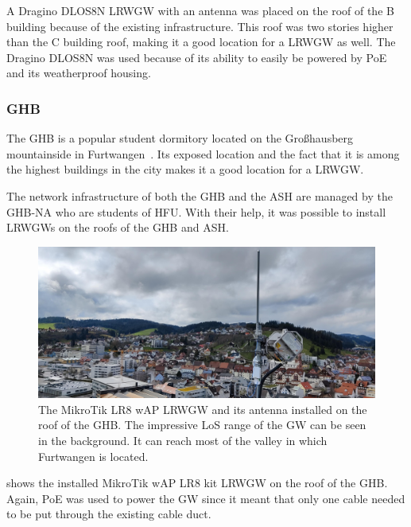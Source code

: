 A Dragino DLOS8N \acl{LRWGW} with an antenna was placed on the roof of the B building because of the existing infrastructure.
This roof was two stories higher than the C building roof, making it a good location for a \acl{LRWGW} as well.
The Dragino DLOS8N was used because of its ability to easily be powered by \ac{PoE} and its weatherproof housing.

\subsubsection{\acl{GHB}}

The \ac{GHB} is a popular student dormitory located on the Großhausberg mountainside in Furtwangen~\cite{ghb_netadmins_student_2023}.
Its exposed location and the fact that it is among the highest buildings in the city makes it a good location for a \acl{LRWGW}.

The network infrastructure of both the \ac{GHB} and the \ac{ASH} are managed by the \acl{GHB-NA} who are students of \ac{HFU}.
With their help, it was possible to install \aclp{LRWGW} on the roofs of the \ac{GHB} and \ac{ASH}.

\begin{figure}[htbp]
    \centering
    \includegraphics[width=1\textwidth]{pictures/hardware/gateway-deployment/lr8_ghb_installation.jpg}
    \caption[MikroTik LR8 wAP \acl{LRWGW} and its antenna installed on the roof of the \acl{GHB}]{
        The MikroTik LR8 wAP \acl{LRWGW} and its antenna installed on the roof of the \ac{GHB}.
        The impressive \ac{LoS} range of the \acl{GW} can be seen in the background.
        It can reach most of the valley in which Furtwangen is located.
    }\label{pic:mikrotik-gateway-ghb-installation}
\end{figure}

 shows the installed MikroTik wAP LR8 kit \acl{LRWGW} on the roof of the \ac{GHB}.
Again, \ac{PoE} was used to power the \acl{GW} since it meant that only one cable needed to be put through the existing cable duct.

